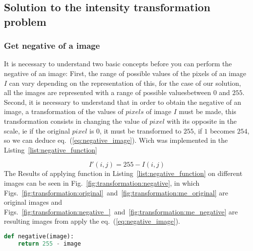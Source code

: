 \documentclass[journal]{IEEEtran}
\begin{document}
\subsection{Solution to the intensity transformation problem}
\subsubsection{Get negative of a image}
It is necessary to understand two basic concepts before you can perform the negative of an image:
First, the range of possible values ​​of the pixels of an image $I$ can vary depending on the representation of this, for the case of our solution, all the images are represented with a range of possible values ​​between $0$ and $255$.
Second, it is necessary to understand that in order to obtain the negative of an image, a transformation of the values of $pixels$ of image $I$ must be made, this transformation consists in changing the value of $pixel$ with its opposite in the scale, ie if the original $pixel$ is $0$, it must be transformed to $255$, if $1$ becomes $254$, so we can deduce eq.~(\ref{eq:negative_image}). Wich was implemented in the Listing~\ref{list:negative_function}


\begin{equation}\label{eq:negative_image}
I'(i,j) = 255 - I(i,j)
\end{equation}
The Results of applying function in Listing~\ref{list:negative_function} on different images can be seen in Fig.~\ref{fig:transformation:negative}, in which Figs.~\ref{fig:transformation:original}~and~\ref{fig:transformation:me_original} are original images and Figs.~\ref{fig:transformation:negative_}~and~\ref{fig:transformation:me_negative}  are resulting images from apply the eq.~(\ref{eq:negative_image}).

\begin{lstlisting}[language=Python, caption=Negative function, label=list:negative_function]
def negative(image):
	return 255 - image
\end{lstlisting}
\end{document}
